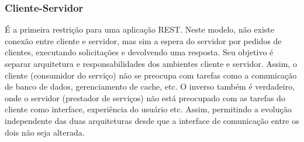 \subsubsection[Cliente-Servidor]{Cliente-Servidor}

É a primeira restrição para uma aplicação REST.  Neste modelo, não existe conexão entre cliente e servidor, mas sim a espera do servidor por pedidos de clientes, executando solicitações e devolvendo uma resposta. Seu objetivo é separar arquitetura e responsabilidades dos ambientes cliente e servidor. Assim, o cliente (consumidor do serviço) não se preocupa com tarefas como a comunicação de banco de dados, gerenciamento de cache, etc. O inverso também é verdadeiro, onde o servidor (prestador de serviços) não está preocupado com as tarefas do cliente como interface, experiência do usuário etc. Assim, permitindo a evolução independente das duas arquiteturas desde que a interface de comunicação entre os dois não seja alterada. \cite{Fielding2000}
